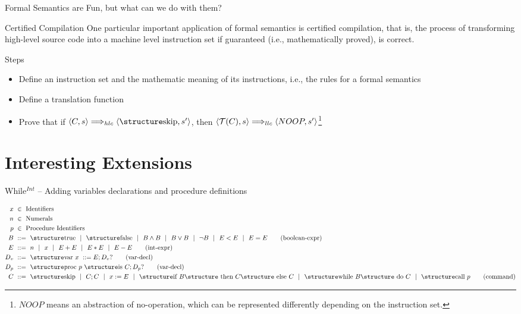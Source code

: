 \documentclass[aspectratio=169]{beamer}
\begin{document}
\begin{slide}{Formal Semantics are Fun, but what can we do with them?}

\begin{block}{Certified Compilation}
One particular important application of formal semantics is certified compilation, that is, the process of transforming high-level source code into a machine level instruction set if guaranteed (i.e., mathematically proved), is correct.
\end{block}

\begin{block}{Steps}
\begin{itemize}
  \item Define an instruction set and the mathematic meaning of its instructions, i.e., the rules for a formal semantics
  \item Define a translation function
  \item Prove that if $\pair{C,s} \Longrightarrow_{hlc} \pair{\kw{skip},s'}$, then $\mathopen{\langle}\mathcal{T}(C),s\mathclose{\rangle} \Longrightarrow_{llc} \mathopen{\langle}NOOP,s'\mathclose{\rangle}$\footnote{$NOOP$ means an abstraction of no-operation, which can be represented differently depending on the instruction set.}
\end{itemize}  
\end{block}

  
\end{slide}

 
\section{Interesting Extensions}


\begin{slide}{While$^{Int}$ -- Adding variables declarations and procedure definitions}
\small

\begin{align*}
  x &~\in~ \text{Identifiers}
  \\
  n &~\in~ \text{Numerals}
  \\
  p &~\in~ \text{Procedure Identifiers}
  \\
  B &~::=~ \kw{true} ~~|~~ \kw{false}  ~~|~~ B \land B ~~|~~ B \lor B ~~|~~ \lnot B ~~|~~ E<E ~~|~~ E=E
  \tag{boolean-expr}\\
  E &~::=~ n ~~|~~ x ~~|~~ E+E ~~|~~ E*E ~~|~~ E-E
  \tag{int-expr}\\
  D_v &~::=~ \kw{var}~x~::=E; D_v? 
  \tag{var-decl}\\
  D_p &~::=~ \kw{proc}~ p~ \kw{is}~ C; D_p? 
  \tag{var-decl}\\
  C &~::=~ \kw {skip} ~~|~~ C;C ~~|~~ x:=E ~~|~~  \kw{if } B \kw{ then } C\kw{ else }C ~~|~~  \kw{while }B\kw{ do }C ~~|~~\kw{call}~p
  \tag{command}
\end{align*}

\end{slide}
\end{document}
